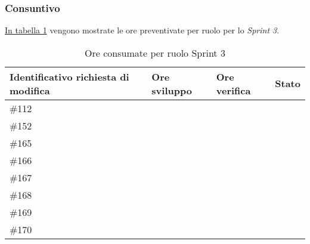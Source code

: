 \subsubsection{Consuntivo}

\hyperref[tab:sprint3_ore_consumate]{In tabella \ref{tab:sprint3_ore_consumate}} vengono mostrate le ore preventivate per ruolo per lo \textit{Sprint 3}.

\begin{table}[H]
    \centering
        \begin{tabular}{| l | l | l | l |}
            \hline
                \textbf{Identificativo richiesta di modifica} & 
                \textbf{Ore sviluppo} &
                \textbf{Ore verifica} & 
                \textbf{Stato}\\ 
    \hline
        \#112 &  & &\\
    \hline
        \#152 &  & &\\
    \hline
        \#165 &  & &\\
    \hline
        \#166 &  & &\\
    \hline
        \#167 &  & &\\
    \hline
        \#168 &  & &\\
    \hline
        \#169 &  & &\\
    \hline
        \#170 & & &\\
    \hline
    \end{tabular}
    \caption{Ore consumate per ruolo Sprint 3}
    \label{tab:sprint3_ore_consumate} 
\end{table}